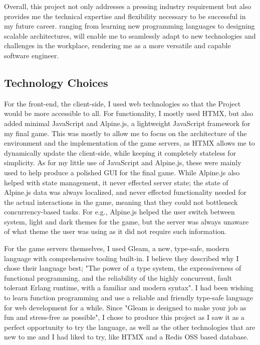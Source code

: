 \documentclass[]{final}
\begin{document}
Overall, this project not only addresses a pressing industry requirement but also provides
me the technical expertise and flexibility necessary to be successful in my future career.
ranging from learning new programming languages to designing scalable architectures, will enable me to
seamlessly adapt to new technologies and challenges in the workplace, rendering me as a more
versatile and capable software engineer.

\newpage

\subsection{Technology Choices}

\label{alpine}

For the front-end, the client-side, I used web technologies so that the Project
would be more accessible to all. For functionality, I mostly used HTMX,
but also added minimal JavaScript and Alpine.js, a lightweight JavaScript
framework for my final game. %
This was mostly to allow me to focus on the
architecture of the environment and the implementation of the game
servers, as HTMX allows me to dynamically update the client-side, while
keeping it completely stateless for simplicity. As for my little use of
JavaScript and Alpine.js, these were mainly used to help produce a polished
GUI for the final game. While Alpine.js also helped with state management,
it never effected server state; the state of Alpine.js data was always
localized, and never effected functionality needed for the actual interactions
in the game, meaning that they could not bottleneck concurrency-based tasks.
For e.g., Alpine.js helped the user switch between system, light and dark
themes for the game, but the server was always unaware of what theme the user
was using as it did not require such information.

\label{REDISOSS}

For the game servers themselves, I used Gleam, a new, type-safe, modern
language with comprehensive tooling built-in. I believe they described why I
chose their language best; "The power of a type system, the expressiveness
of functional programming, and the reliability of the highly concurrent,
fault tolerant Erlang runtime, with a familiar and modern syntax".
I had been wishing to learn function programming and use a reliable and friendly
type-safe language for web development for a while.
Since "Gleam is designed to make your job as fun and stress-free as possible",
I chose to produce this project as I saw it as a perfect opportunity to try the
language, as well as the other technologies that are new to me and I had liked
to try, like HTMX and a Redis OSS based database.
\end{document}
